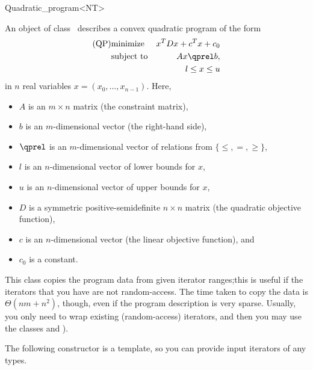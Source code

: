 \begin{ccRefClass}{Quadratic_program<NT>}


\ccDefinition
An object of class \ccRefName\ describes a convex quadratic program of the form
\begin{eqnarray*}
\mbox{(QP)}& \mbox{minimize} & x^{T}Dx+c^{T}x+c_0 \\
&\mbox{subject to}   & Ax\qprel b, \\
&                    & l \leq x \leq u
\end{eqnarray*}
in $n$ real variables $x=(x_0,\ldots,x_{n-1})$.
Here, 
\begin{itemize}
\item $A$ is an $m\times n$ matrix (the constraint matrix), 
\item $b$ is an $m$-dimensional vector (the right-hand side),
\item $\qprel$ is an $m$-dimensional vector of relations 
from $\{\leq, =, \geq\}$, 
\item $l$ is an $n$-dimensional vector of lower
bounds for $x$,
\item $u$ is an $n$-dimensional vector of upper bounds for
$x$, 
\item $D$ is a symmetric positive-semidefinite $n\times n$ matrix (the
  quadratic objective function),
\item $c$ is an $n$-dimensional vector (the linear objective
  function), and 
\item $c_0$ is a constant.
\end{itemize}

This class copies the program data from given iterator ranges;this
is useful if the iterators that you have are not random-access.
The time taken to copy the data is $\Theta(nm+n^2)$, though, even if the
program description is very sparse. Usually, 
you only need to wrap existing (random-access)
iterators, and then you may use the classes 
 and ).

\ccIsModel
{}

\ccCreation
\ccIndexClassCreation
{}

The following constructor is a template, so you can provide input
iterators of any types.


\ccSeeAlso
{}\\


\end{ccRefClass}
